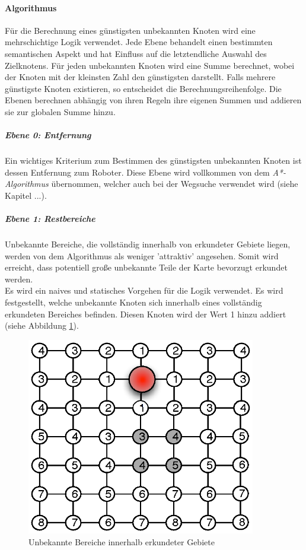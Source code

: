 \documentclass[10pt,a4paper]{article}
\begin{document}
			\paragraph*{Algorithmus}Für die Berechnung eines günstigsten unbekannten Knoten wird eine mehrschichtige Logik verwendet.
				Jede Ebene behandelt einen bestimmten semantischen Aspekt und hat Einfluss auf die letztendliche Auswahl des Zielknotens. Für
				jeden unbekannten Knoten wird eine Summe berechnet, wobei der Knoten mit der kleinsten Zahl den günstigsten darstellt. Falls
				mehrere günstigste Knoten existieren, so entscheidet die Berechnungsreihenfolge. Die Ebenen berechnen abhängig von ihren Regeln
				ihre eigenen Summen und addieren sie zur globalen Summe hinzu.
				\subparagraph*{Ebene 0: Entfernung} Ein wichtiges Kriterium zum Bestimmen des günstigsten unbekannten Knoten ist dessen
					Entfernung zum Roboter. Diese Ebene wird vollkommen von dem \textit{A*-Algorithmus} übernommen, welcher auch bei der
					Wegsuche verwendet wird (siehe Kapitel ...).
  				\subparagraph*{Ebene 1: Restbereiche} Unbekannte Bereiche, die vollständig innerhalb von erkundeter Gebiete liegen, werden von
  					dem Algorithmus als weniger 'attraktiv' angesehen. Somit wird erreicht, dass potentiell große unbekannte Teile der Karte
  					bevorzugt erkundet werden. \\
  					Es wird ein naives und statisches Vorgehen für die Logik verwendet. Es wird festgestellt, welche unbekannte Knoten sich innerhalb
  					eines vollständig erkundeten Bereiches befinden. Diesen Knoten wird der Wert 1 hinzu addiert (siehe Abbildung \ref{fig:level1}).  			
					\begin{figure}[h]
						\centering
						\includegraphics[width=10cm]{images/eingeschlossen.eps}
  						\caption{Unbekannte Bereiche innerhalb erkundeter Gebiete}
  						\label{fig:level1}
  					\end{figure}
\end{document}
